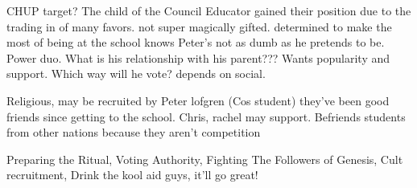 \documentclass[char]{GL2020}
\begin{document}
\name{\cAmbition{}}








CHUP target? The child of the Council Educator gained their position due to the trading in of many favors.  not super magically gifted.  determined to make the most of being at the school  knows Peter's not as dumb as he pretends to be. Power duo.  What is his relationship with his parent???  Wants popularity and support.  Which way will he vote?  depends on social.

Religious, may be recruited by Peter lofgren (Cos student) they've been good friends since getting to the school.  Chris, rachel may support.  Befriends students from other nations because they aren't competition

Preparing the Ritual, Voting Authority, Fighting The Followers of Genesis, Cult recruitment, Drink the kool aid guys, it'll go great!
\end{document}
